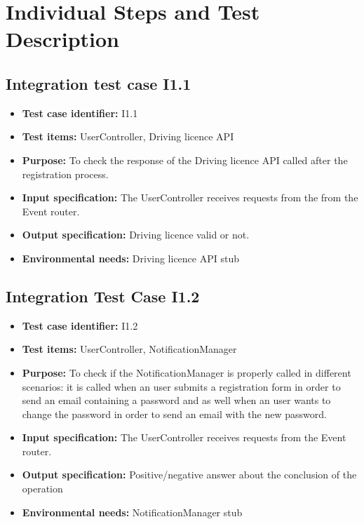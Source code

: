 \chapter{Individual Steps and Test Description}
\section{Integration test case I1.1}

\begin{itemize}
\item \textbf{Test case identifier:} I1.1
\item \textbf{Test items:} UserController, Driving licence API
\item \textbf{Purpose:} To check the response of the Driving licence API called after the registration process.
\item \textbf{Input specification:} The UserController receives requests from the from the Event router.
\item \textbf{Output specification:} Driving licence valid or not.
\item \textbf{Environmental needs:} Driving licence API stub
\end{itemize}

\section{Integration Test Case I1.2}
\begin{itemize}
\item \textbf{Test case identifier:}  I1.2
\item \textbf{Test items:} UserController, NotificationManager
\item \textbf{Purpose:} To check if the NotificationManager is properly called in different scenarios: it is called when an user submits a registration form in order to send an email containing a password and as well when an user wants to change the password  in order to send an email with the new password.
\item \textbf{Input specification:} The UserController receives requests from the Event router.
\item \textbf{Output specification:} Positive/negative answer about the conclusion of the operation
\item \textbf{Environmental needs:} NotificationManager stub
\end{itemize}

